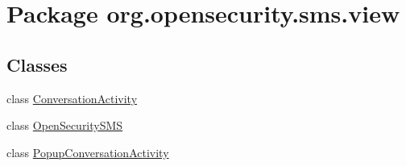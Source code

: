 \hypertarget{a00041}{\section{Package org.\+opensecurity.\+sms.\+view}
\label{a00041}
}
\subsection*{Classes}
\begin{DoxyCompactItemize}
\item 
class \hyperlink{a00006}{Conversation\+Activity}
\item 
class \hyperlink{a00011}{Open\+Security\+S\+M\+S}
\item 
class \hyperlink{a00013}{Popup\+Conversation\+Activity}
\end{DoxyCompactItemize}
